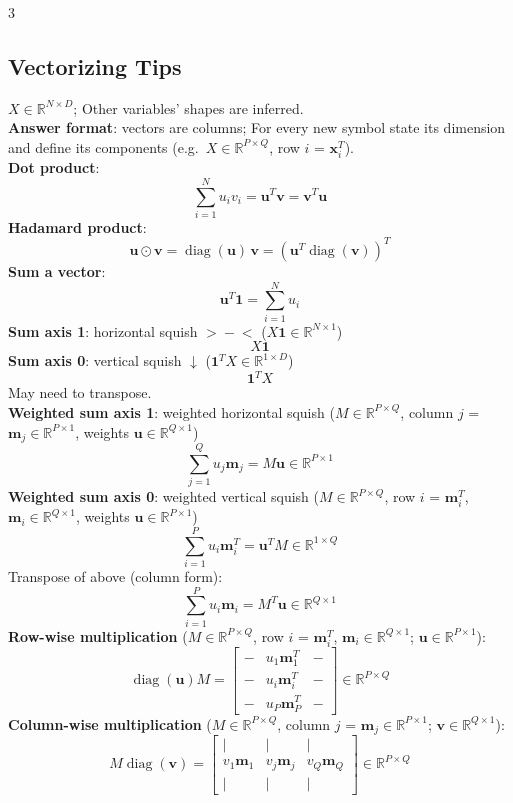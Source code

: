 \documentclass[10pt]{article}
\newcommand{\vu}{\mathbf{u}}
\newcommand{\vv}{\mathbf{v}}
\begin{document}
\begin{multicols*}{3}
\subsection{Vectorizing Tips}
$X\in\mathbb R^{N\times D}$; Other variables' shapes are inferred.\\
\textbf{Answer format}: vectors are columns; For every new symbol state its dimension and define its components (e.g.\ $X\in\mathbb R^{P\times Q}$, row $i$ = $\mathbf x_i^T$).\\
\textbf{Dot product}:
\[ \textstyle\sum_{i=1}^N u_i v_i = \vu^T\vv = \vv^T\vu \]
\textbf{Hadamard product}:
\[ \vu\odot\vv = \operatorname{diag}(\vu)\,\vv = \left(\vu^T\operatorname{diag}(\vv)\right)^T \]
\textbf{Sum a vector}:
\[ \vu^T\mathbf{1} = \textstyle\sum_{i=1}^N u_i \]
\textbf{Sum axis 1}: horizontal squish $>\!-\!<$ ($X\mathbf 1\in\mathbb R^{N\times1}$)
\[ X\mathbf{1} \]
\textbf{Sum axis 0}: vertical squish $\downarrow$ ($\mathbf 1^TX\in\mathbb R^{1\times D}$)
\[ \mathbf{1}^T X \]
May need to transpose.\\
\textbf{Weighted sum axis 1}: weighted horizontal squish ($M\in\mathbb R^{P\times Q}$, column $j$ = $\mathbf m_j\in\mathbb R^{P\times1}$, weights $\vu\in\mathbb R^{Q\times1}$)
\[ \textstyle\sum_{j=1}^Q u_j\mathbf m_j = M\vu\in\mathbb R^{P\times1} \]
\textbf{Weighted sum axis 0}: weighted vertical squish ($M\in\mathbb R^{P\times Q}$, row $i$ = $\mathbf m_i^T$, $\mathbf m_i\in\mathbb R^{Q\times1}$, weights $\vu\in\mathbb R^{P\times1}$)
\[ \textstyle\sum_{i=1}^P u_i\mathbf m_i^T = \vu^TM\in\mathbb R^{1\times Q} \]
Transpose of above (column form):
\[ \textstyle\sum_{i=1}^P u_i\mathbf m_i = M^T\vu\in\mathbb R^{Q\times1} \]
\textbf{Row-wise multiplication} ($M\in\mathbb R^{P\times Q}$, row $i$ = $\mathbf m_i^T$, $\mathbf m_i\in\mathbb R^{Q\times1}$; $\vu\in\mathbb R^{P\times1}$):
\[ \operatorname{diag}(\vu)M = \begin{bmatrix} - & u_1\mathbf m_1^T & - \\ - & u_i\mathbf m_i^T & - \\ - & u_P\mathbf m_P^T & - \end{bmatrix}\in\mathbb R^{P\times Q} \]
\textbf{Column-wise multiplication} ($M\in\mathbb R^{P\times Q}$, column $j$ = $\mathbf m_j\in\mathbb R^{P\times1}$; $\vv\in\mathbb R^{Q\times1}$):
\[ M\operatorname{diag}(\vv) = \begin{bmatrix} | & | & | \\ v_1\mathbf m_1 & v_j\mathbf m_j & v_Q\mathbf m_Q \\ | & | & | \end{bmatrix}\in\mathbb R^{P\times Q} \]

\end{multicols*}
\end{document}
